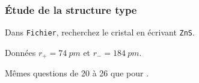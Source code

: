 \documentclass[a4paper, 10pt, final, garamond]{book}
\begin{document}

\subsubsection{Étude de la structure type }
\label{sssec:zns}
Dans \texttt{Fichier}, recherchez le cristal  en écrivant \texttt{ZnS}.
\begin{rdefi}{Données}
  $r_{+} = \SI{74}{pm}$ et $r_{-} = \SI{184}{pm}$.
\end{rdefi}
\begin{center}
  \begin{framed}
    \large
    Mêmes questions de 20 à 26 que pour .
  \end{framed}
\end{center}
\end{document}
